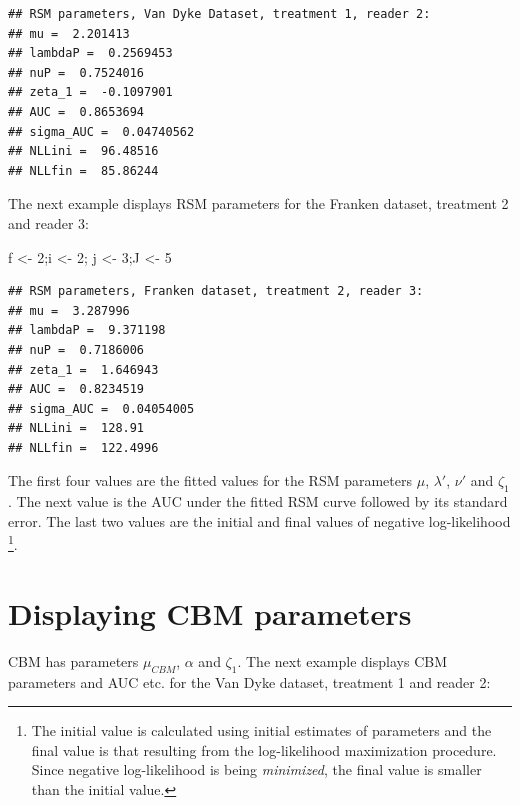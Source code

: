 \documentclass[
]{book}
\newenvironment{Shaded}{\begin{snugshade}}{\end{snugshade}}
\newcommand{\DecValTok}[1]{\textcolor[rgb]{0.00,0.00,0.81}{#1}}
\newcommand{\NormalTok}[1]{#1}
\newcommand{\OtherTok}[1]{\textcolor[rgb]{0.56,0.35,0.01}{#1}}
\begin{document}
\begin{verbatim}
## RSM parameters, Van Dyke Dataset, treatment 1, reader 2: 
## mu =  2.201413 
## lambdaP =  0.2569453 
## nuP =  0.7524016 
## zeta_1 =  -0.1097901 
## AUC =  0.8653694 
## sigma_AUC =  0.04740562 
## NLLini =  96.48516 
## NLLfin =  85.86244
\end{verbatim}

The next example displays RSM parameters for the Franken dataset, treatment 2 and reader 3:

\begin{Shaded}
\begin{Highlighting}[]
\NormalTok{f }\OtherTok{\textless{}{-}} \DecValTok{2}\NormalTok{;i }\OtherTok{\textless{}{-}} \DecValTok{2}\NormalTok{; j }\OtherTok{\textless{}{-}} \DecValTok{3}\NormalTok{;J }\OtherTok{\textless{}{-}} \DecValTok{5}
\end{Highlighting}
\end{Shaded}

\begin{verbatim}
## RSM parameters, Franken dataset, treatment 2, reader 3: 
## mu =  3.287996 
## lambdaP =  9.371198 
## nuP =  0.7186006 
## zeta_1 =  1.646943 
## AUC =  0.8234519 
## sigma_AUC =  0.04054005 
## NLLini =  128.91 
## NLLfin =  122.4996
\end{verbatim}

The first four values are the fitted values for the RSM parameters \(\mu\), \(\lambda'\), \(\nu'\) and \(\zeta_1\). The next value is the AUC under the fitted RSM curve followed by its standard error. The last two values are the initial and final values of negative log-likelihood \footnote{The initial value is calculated using initial estimates of parameters and the final value is that resulting from the log-likelihood maximization procedure. Since negative log-likelihood is being \emph{minimized}, the final value is smaller than the initial value.}.

\hypertarget{rsm-3-fits-cbm-parameters}{%
\section{Displaying CBM parameters}\label{rsm-3-fits-cbm-parameters}}

CBM has parameters \(\mu_{CBM}\), \(\alpha\) and \(\zeta_1\). The next example displays CBM parameters and AUC etc. for the Van Dyke dataset, treatment 1 and reader 2:
\end{document}
